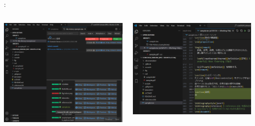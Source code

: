 \documentclass[aspectratio=169,dvipdfmx,cjk]{beamer}
\begin{document}
\begin{frame}{\insertsection \thesubsection: \insertsubsection}
\begin{columns}
    \begin{column}{0.3\textwidth}
      \includegraphics[width=1.0\linewidth]{fig/git-history2.png}
    \end{column}
    \begin{column}{0.3\textwidth}
      \includegraphics[width=1.0\linewidth]{fig/git-history3.png}
    \end{column}
  \end{columns}
\end{frame}
\end{document}
